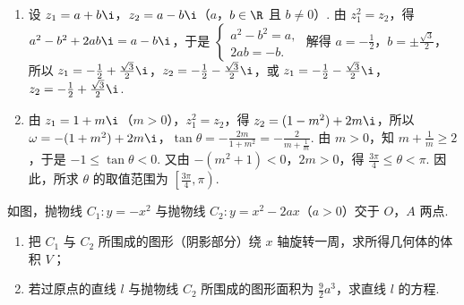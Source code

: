 \documentclass[UTF8,a4paper,oneside,11pt]{ctexbook}
\begin{document}
\begin{solution}
\begin{enumerate}
\item 设 \(z_1=a+b\i\)，\(z_2=a-b\i\)（\(a\)，\(b \in \R\) 且 \(b \neq 0\)）. 由 \(z_1^2=z_2\)，得 \(a^2-b^2+2ab\i=a-b\i\)，于是 \(\begin{cases}
a^2-b^2=a,\\
2ab=-b.
\end{cases}\) 解得 \(a=-\frac{1}{2}\)，\(b=\pm\frac{\sqrt{3}}{2}\)，所以 \(z_1=-\frac{1}{2}+\frac{\sqrt{3}}{2}\i\)，\(z_2=-\frac{1}{2}-\frac{\sqrt{3}}{2}\i\)，或 \(z_1=-\frac{1}{2}-\frac{\sqrt{3}}{2}\i\)，\(z_2=-\frac{1}{2}+\frac{\sqrt{3}}{2}\i\).

\item 由 \(z_1=1+m\i\)（\(m>0\)），\(z_1^2=z_2\)，得 \(z_2=(1-m^2)+2m\i\)，所以 \(\omega=-(1+m^2)+2m\i\)，\(\tan \theta=-\frac{2m}{1+m^2}=-\frac{2}{m+\frac{1}{m}}\). 由 \(m>0\)，知 \(m+\frac{1}{m} \geqslant 2\)，于是 \(-1 \leqslant \tan \theta < 0\). 又由 \(-(m^2+1)<0\)，\(2m>0\)，得 \(\frac{3\pi}{4} \leqslant \theta < \pi\). 因此，所求 \(\theta\) 的取值范围为 \(\left[\frac{3\pi}{4}, \pi\right)\).
\end{enumerate}
\end{solution}

\reuseproblemnumber
\begin{problem}[B]
如图，抛物线 \(C_1:y=-x^2\) 与抛物线 \(C_2:y=x^2-2ax\)（\(a>0\)）交于 \(O\)，\(A\) 两点.
\begin{enumerate}
\item 把 \(C_1\) 与 \(C_2\) 所围成的图形（阴影部分）绕 \(x\) 轴旋转一周，求所得几何体的体积 \(V\)；
\item 若过原点的直线 \(l\) 与抛物线 \(C_2\) 所围成的图形面积为 \(\frac{9}{2}a^3\)，求直线 \(l\) 的方程.
\end{enumerate}

\end{problem}
\end{document}
